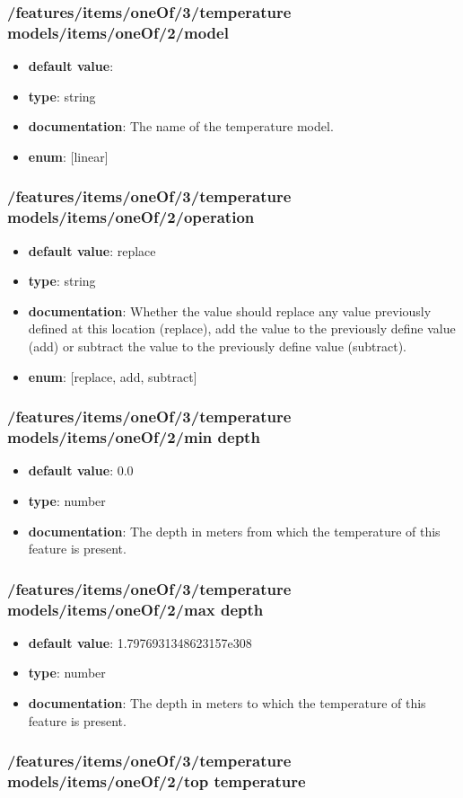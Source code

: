 \subsubsection{/features/items/oneOf/3/temperature models/items/oneOf/2/model}
\begin{itemize}\item {\bf default value}: 
\item {\bf type}: string
\item {\bf documentation}: The name of the temperature model.
\item {\bf enum}: [linear]\end{itemize}\subsubsection{/features/items/oneOf/3/temperature models/items/oneOf/2/operation}
\begin{itemize}\item {\bf default value}: replace
\item {\bf type}: string
\item {\bf documentation}: Whether the value should replace any value previously defined at this location (replace), add the value to the previously define value (add) or subtract the value to the previously define value (subtract).
\item {\bf enum}: [replace, add, subtract]\end{itemize}\subsubsection{/features/items/oneOf/3/temperature models/items/oneOf/2/min depth}
\begin{itemize}\item {\bf default value}: 0.0
\item {\bf type}: number
\item {\bf documentation}: The depth in meters from which the temperature of this feature is present.
\end{itemize}\subsubsection{/features/items/oneOf/3/temperature models/items/oneOf/2/max depth}
\begin{itemize}\item {\bf default value}: 1.7976931348623157e308
\item {\bf type}: number
\item {\bf documentation}: The depth in meters to which the temperature of this feature is present.
\end{itemize}\subsubsection{/features/items/oneOf/3/temperature models/items/oneOf/2/top temperature}

